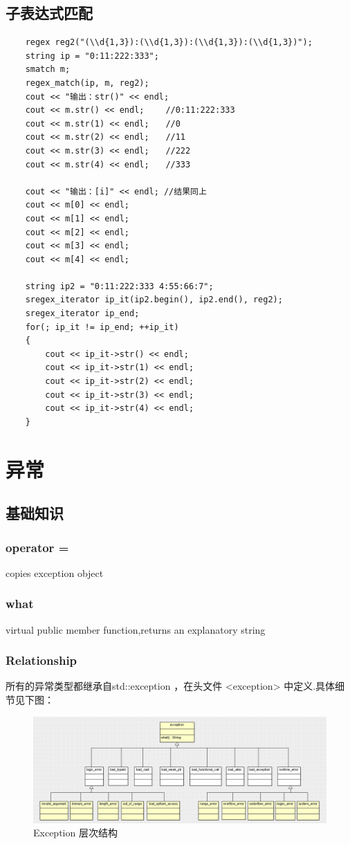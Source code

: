 \documentclass[UTF8,a4paper,12pt]{ctexbook}
\begin{document}
	\section{子表达式匹配}
		\begin{lstlisting}
	regex reg2("(\\d{1,3}):(\\d{1,3}):(\\d{1,3}):(\\d{1,3})");
	string ip = "0:11:222:333";
	smatch m; 
	regex_match(ip, m, reg2);
	cout << "输出：str()" << endl;
	cout << m.str() << endl;　　 //0:11:222:333
	cout << m.str(1) << endl;　　//0
	cout << m.str(2) << endl;　　//11
	cout << m.str(3) << endl;　　//222
	cout << m.str(4) << endl;　　//333
	
	cout << "输出：[i]" << endl; //结果同上
	cout << m[0] << endl;
	cout << m[1] << endl;
	cout << m[2] << endl;
	cout << m[3] << endl;
	cout << m[4] << endl;
	
	string ip2 = "0:11:222:333 4:55:66:7";
	sregex_iterator ip_it(ip2.begin(), ip2.end(), reg2);
	sregex_iterator ip_end;
	for(; ip_it != ip_end; ++ip_it)
	{
		cout << ip_it->str() << endl;
		cout << ip_it->str(1) << endl;
		cout << ip_it->str(2) << endl;
		cout << ip_it->str(3) << endl;
		cout << ip_it->str(4) << endl;
	}
		\end{lstlisting}
		
	
\chapter{异常}
	\section{基础知识}
		\subsection{operator =}
			copies exception object
		\subsection{what}
			virtual public member function,returns an explanatory string 
		\subsection{Relationship}
			所有的异常类型都继承自std::exception ，在头文件 <exception> 中定义.具体细节见下图：
			\begin{figure}[h]
				\centering
				\includegraphics[scale = 0.45]{exception_level.png}
				\caption{Exception 层次结构}
			\end{figure}
		
\end{document}
